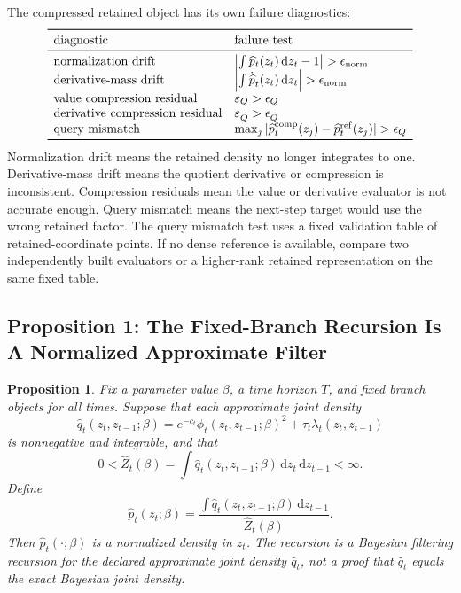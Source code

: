 \documentclass[11pt]{article}
\newtheorem{proposition}{Proposition}
\numberwithin{equation}{section}
\newcommand{\dd}{\,\mathrm d}
\begin{document}
The compressed retained object has its own failure diagnostics:
\begin{equation}
\begin{array}{ll}
\toprule
\text{diagnostic} & \text{failure test}\\
\midrule
\text{normalization drift} &
\left|\int \widehat p_t(z_t)\dd z_t-1\right|>\epsilon_{\rm norm}\\
\text{derivative-mass drift} &
\left|\int \dot{\widehat p}_t(z_t)\dd z_t\right|>\epsilon_{\rm norm}\\
\text{value compression residual} &
\varepsilon_Q>\epsilon_Q\\
\text{derivative compression residual} &
\varepsilon_{\dot Q}>\epsilon_{\dot Q}\\
\text{query mismatch} &
\max_j|\widehat p_t^{\rm comp}(z_j)-\widehat p_t^{\rm ref}(z_j)|>\epsilon_Q\\
\bottomrule
\end{array}
    \label{eq:p26-retained-storage-12}
\end{equation}
Normalization drift means the retained density no longer integrates to one.
Derivative-mass drift means the quotient derivative or compression is
inconsistent.  Compression residuals mean the value or derivative evaluator is
not accurate enough.  Query mismatch means the next-step target would use the
wrong retained factor.  The query mismatch test uses a fixed validation table
of retained-coordinate points.  If no dense reference is available, compare
two independently built evaluators or a higher-rank retained representation on
the same fixed table.

\subsection{Proposition 1: The Fixed-Branch Recursion Is A Normalized Approximate Filter}

\begin{proposition}
Fix a parameter value \(\beta\), a time horizon \(T\), and fixed branch objects
for all times.  Suppose that each approximate joint density
\begin{equation}
    \widehat q_t(z_t,z_{t-1};\beta)
    =
    e^{-c_t}\phi_t(z_t,z_{t-1};\beta)^2
    +
    \tau_t\lambda_t(z_t,z_{t-1})
    \label{eq:p24-p19-77}
\end{equation}
is nonnegative and integrable, and that
\begin{equation}
    0<\widehat Z_t(\beta)
    =
    \int \widehat q_t(z_t,z_{t-1};\beta)\dd z_t\dd z_{t-1}
    <\infty.
    \label{eq:p24-p19-78}
\end{equation}
Define
\begin{equation}
    \widehat p_t(z_t;\beta)
    =
    \frac{\int \widehat q_t(z_t,z_{t-1};\beta)\dd z_{t-1}}
    {\widehat Z_t(\beta)}.
    \label{eq:p24-p19-79}
\end{equation}
Then \(\widehat p_t(\cdot;\beta)\) is a normalized density in \(z_t\).  The
recursion is a Bayesian filtering recursion for the declared approximate joint
density \(\widehat q_t\), not a proof that \(\widehat q_t\) equals the exact
Bayesian joint density.
\end{proposition}
\end{document}

